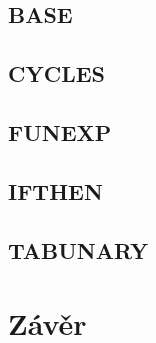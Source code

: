 \documentclass[12pt]{article}
\begin{document}
\subsection{BASE}
\subsection{CYCLES}
\subsection{FUNEXP}
\subsection{IFTHEN}
\subsection{TABUNARY}
\section{Závěr}
\end{document}
